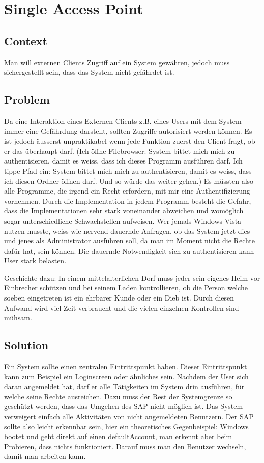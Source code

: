 \chapter{Single Access Point}

\section{Context}
Man will externen Clients Zugriff auf ein System gewähren, jedoch muss sichergestellt sein, dass das System nicht gefährdet ist.

\section{Problem}
Da eine Interaktion eines Externen Clients z.B. eines Users mit dem System immer eine Gefährdung darstellt, sollten Zugriffe autorisiert werden können. Es ist jedoch äusserst unpraktikabel wenn jede Funktion zuerst den Client fragt, ob er das überhaupt darf. (Ich öffne Filebrowser: System bittet mich mich zu authentisieren, damit es weiss, dass ich dieses Programm ausführen darf. Ich tippe Pfad ein: System bittet mich mich zu authentisieren, damit es weiss, dass ich diesen Ordner öffnen darf. Und so würde das weiter gehen.) Es müssten also alle Programme, die irgend ein Recht erfordern, mit mir eine Authentifizierung vornehmen. Durch die Implementation in jedem Programm besteht die Gefahr, dass die Implementationen sehr stark voneinander abweichen und womöglich sogar unterschiedliche Schwachstellen aufweisen. Wer jemals Windows Vista nutzen musste, weiss wie nervend dauernde Anfragen, ob das System jetzt dies und jenes als Administrator ausführen soll, da man im Moment nicht die Rechte dafür hat, sein können. Die dauernde Notwendigkeit sich zu authentisieren kann User stark belasten.

Geschichte dazu: In einem mittelalterlichen Dorf muss jeder sein eigenes Heim vor Einbrecher schützen und bei seinem Laden kontrollieren, ob die Person welche soeben eingetreten ist ein ehrbarer Kunde oder ein Dieb ist. Durch diesen Aufwand wird viel Zeit verbraucht und die vielen einzelnen Kontrollen sind mühsam.

\section{Solution}
Ein System sollte einen zentralen Eintrittspunkt haben. Dieser Eintrittspunkt kann zum Beispiel ein Loginscreen oder ähnliches sein. Nachdem der User sich daran angemeldet hat, darf er alle Tätigkeiten im System drin ausführen, für welche seine Rechte ausreichen. Dazu muss der Rest der Systemgrenze so geschützt werden, dass das Umgehen des SAP nicht möglich ist. Das System verweigert einfach alle Aktivitäten von nicht angemeldeten Benutzern. Der SAP sollte also leicht erkennbar sein, hier ein theoretisches Gegenbeispiel: Windows bootet und geht direkt auf einen defaultAccount, man erkennt aber beim Probieren, dass nichts funktioniert. Darauf muss man den Benutzer wechseln, damit man arbeiten kann.

